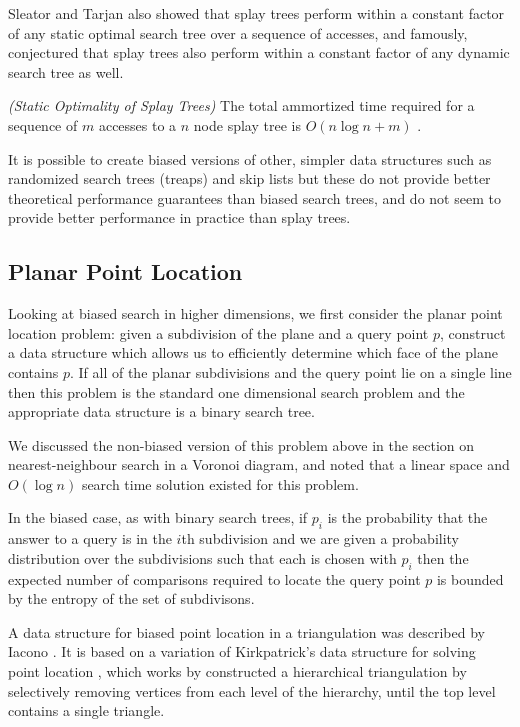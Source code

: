 \documentclass[mcs]{scsthesis}
\begin{document}
Sleator and Tarjan also showed that splay trees perform within a constant
factor of any static optimal search tree over a sequence of accesses, and
famously, conjectured that splay trees also perform within a constant factor
of any dynamic search tree as well.

\begin{thm} \emph{(Static Optimality of Splay Trees)} 
The total ammortized time required for a sequence of $m$ accesses to a $n$
node splay tree is \(O(n \log n + m)\) \cite{splaytree}.
\end{thm}

It is possible to create biased versions of other, simpler data structures
such as randomized search trees (treaps) \cite{treap} and skip lists
\cite{bsl2} but these do not provide better theoretical performance guarantees
than biased search trees, and do not seem to provide better performance in
practice than splay trees.

\subsection{Planar Point Location}

Looking at biased search in higher dimensions, we first consider the planar
point location problem: given a subdivision of the plane and a query point \(p\),
construct a data structure which allows us to efficiently determine which face
of the plane contains \(p\). If all of the planar subdivisions and the query
point lie on a single line then this problem is the standard one dimensional
search problem and the appropriate data structure is a binary search tree.

We discussed the non-biased version of this problem above in the section on
nearest-neighbour search in a Voronoi diagram, and noted that a linear space
and \(O(\log n)\) search time solution existed for this problem.

In the biased case, as with binary search trees, if \(p_i\) is the probability
that the answer to a query is in the \(i\)th subdivision and we are given a
probability distribution over the subdivisions such that each is chosen with
\(p_i\) then the expected number of comparisons required to locate the query
point \(p\) is bounded by the entropy of the set of subdivisons.

A data structure for biased point location in a triangulation was described
by Iacono \cite{iacono}. It is based on a variation of Kirkpatrick's data
structure for solving point location \cite{kirkpatrick}, which works by
constructed a hierarchical triangulation by selectively removing vertices
from each level of the hierarchy, until the top level contains a single triangle.
\end{document}
